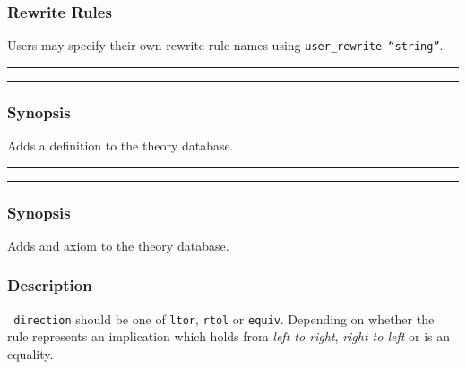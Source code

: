 \subsubsection{Rewrite Rules}

Users may specify their own rewrite rule names using {\tt user\_rewrite
  ``string''}. 


\vspace{2mm}
\hrule
\vspace{2mm}
\begin{Large}
\end{Large}
\vspace{2mm}
\hrule
\vspace{2mm}

\begin{small}
\end{small}

\subsubsection*{Synopsis}
Adds a definition to the theory database.

\vspace{2mm}
\hrule
\vspace{2mm}
\begin{Large}
\end{Large}
\vspace{2mm}
\hrule
\vspace{2mm}

\begin{small}
\end{small}

\subsubsection*{Synopsis}
Adds and axiom to the theory database.  

\subsubsection*{Description}
{\tt
  direction} should be one of {\tt ltor}, 
{\tt rtol} or {\tt equiv}.  Depending on
whether the rule represents an
implication which holds from {\em left to right},
{\em right to left} or is an equality.

